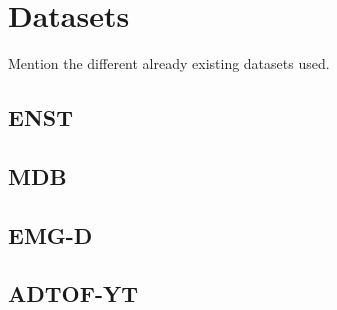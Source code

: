 \chapter{Datasets}

Mention the different already existing datasets used.

\section{ENST}

\section{MDB}

\section{EMG-D}

\section{ADTOF-YT}